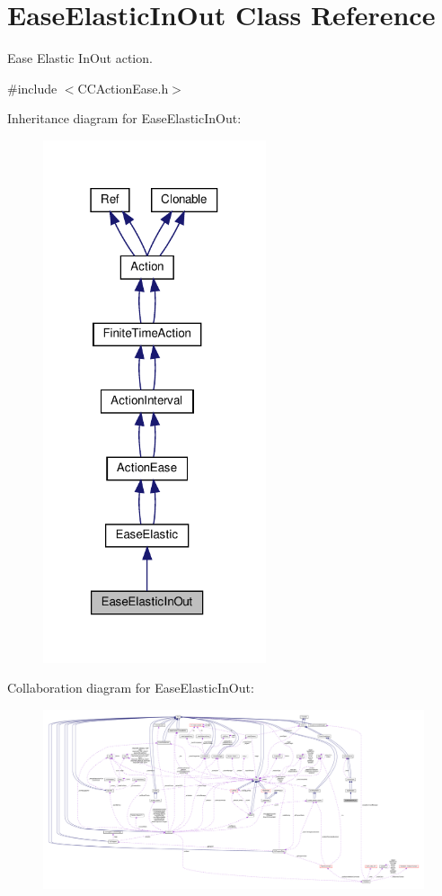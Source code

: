 \hypertarget{classEaseElasticInOut}{}\section{Ease\+Elastic\+In\+Out Class Reference}
\label{classEaseElasticInOut}


Ease Elastic In\+Out action.  




{\ttfamily \#include $<$C\+C\+Action\+Ease.\+h$>$}



Inheritance diagram for Ease\+Elastic\+In\+Out\+:
\nopagebreak
\begin{figure}[H]
\begin{center}
\leavevmode
\includegraphics[width=186pt]{classEaseElasticInOut__inherit__graph}
\end{center}
\end{figure}


Collaboration diagram for Ease\+Elastic\+In\+Out\+:
\nopagebreak
\begin{figure}[H]
\begin{center}
\leavevmode
\includegraphics[width=350pt]{classEaseElasticInOut__coll__graph}
\end{center}
\end{figure}

